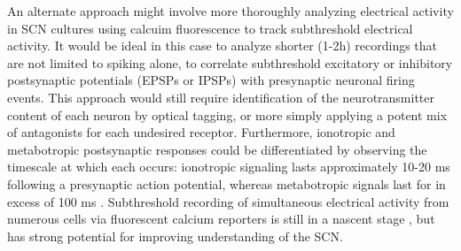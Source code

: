 An alternate approach might involve more thoroughly analyzing electrical activity in SCN cultures using calcuim fluorescence to track subthreshold electrical activity.
It would be ideal in this case to analyze shorter (1-2h) recordings that are not limited to spiking alone, to correlate subthreshold excitatory or inhibitory postsynaptic potentials (EPSPs or IPSPs) with presynaptic neuronal firing events.
This approach would still require identification of the neurotransmitter content of each neuron by optical tagging, or more simply applying a potent mix of antagonists for each undesired receptor.
Furthermore, ionotropic and metabotropic postsynaptic responses could be differentiated by observing the timescale at which each occurs: ionotropic signaling lasts approximately 10-20 ms following a presynaptic action potential, whereas metabotropic signals last for in excess of 100 ms \cite{fain1999}.
Subthreshold recording of simultaneous electrical activity from numerous cells via fluorescent calcium reporters is still in a nascent stage \cite{Chen2013a}, but has strong potential for improving understanding of the SCN.

